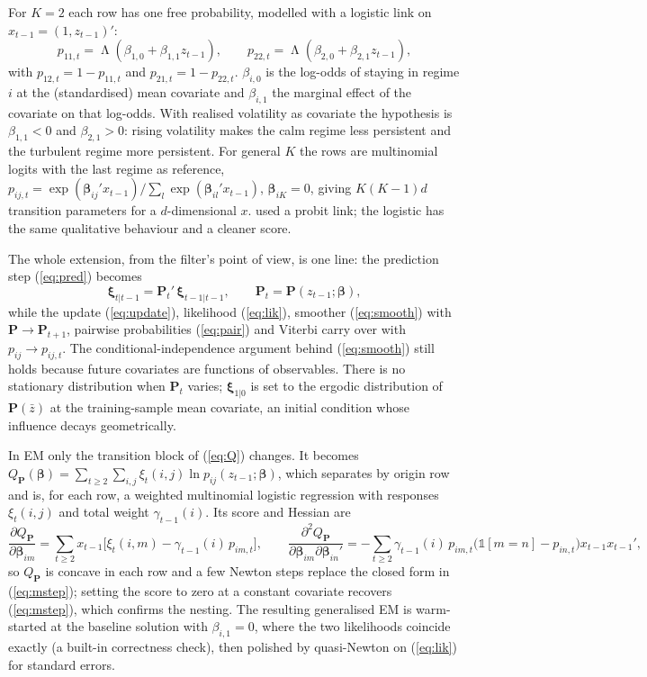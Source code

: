 \documentclass[11pt,a4paper]{article}
\newcommand{\bxi}{\bm{\xi}}
\newcommand{\bP}{\mathbf{P}}
\newcommand{\bbeta}{\bm{\beta}}
\DeclareMathOperator{\Lam}{\Lambda}
\begin{document}
For $K=2$ each row has one free probability, modelled with a logistic link on $x_{t-1}=(1,z_{t-1})'$:
\begin{equation}\label{eq:tvtp2}
p_{11,t}=\Lam(\beta_{1,0}+\beta_{1,1}z_{t-1}),\qquad p_{22,t}=\Lam(\beta_{2,0}+\beta_{2,1}z_{t-1}),
\end{equation}
with $p_{12,t}=1-p_{11,t}$ and $p_{21,t}=1-p_{22,t}$. $\beta_{i,0}$ is the log-odds of staying in regime $i$ at the (standardised) mean covariate and $\beta_{i,1}$ the marginal effect of the covariate on that log-odds. With realised volatility as covariate the hypothesis is $\beta_{1,1}<0$ and $\beta_{2,1}>0$: rising volatility makes the calm regime less persistent and the turbulent regime more persistent. For general $K$ the rows are multinomial logits with the last regime as reference, $p_{ij,t}=\exp(\bbeta_{ij}'x_{t-1})/\sum_l\exp(\bbeta_{il}'x_{t-1})$, $\bbeta_{iK}=0$, giving $K(K-1)d$ transition parameters for a $d$-dimensional $x$. \citet{filardo1994} used a probit link; the logistic has the same qualitative behaviour and a cleaner score.

The whole extension, from the filter's point of view, is one line: the prediction step (\ref{eq:pred}) becomes
\begin{equation}\label{eq:tvtpfilter}
\bxi_{t|t-1}=\bP_t'\,\bxi_{t-1|t-1},\qquad \bP_t=\bP(z_{t-1};\bbeta),
\end{equation}
while the update (\ref{eq:update}), likelihood (\ref{eq:lik}), smoother (\ref{eq:smooth}) with $\bP\to\bP_{t+1}$, pairwise probabilities (\ref{eq:pair}) and Viterbi carry over with $p_{ij}\to p_{ij,t}$. The conditional-independence argument behind (\ref{eq:smooth}) still holds because future covariates are functions of observables. There is no stationary distribution when $\bP_t$ varies; $\bxi_{1|0}$ is set to the ergodic distribution of $\bP(\bar z)$ at the training-sample mean covariate, an initial condition whose influence decays geometrically.

In EM only the transition block of (\ref{eq:Q}) changes. It becomes $Q_{\bP}(\bbeta)=\sum_{t\ge2}\sum_{i,j}\xi_t(i,j)\ln p_{ij}(z_{t-1};\bbeta)$, which separates by origin row and is, for each row, a weighted multinomial logistic regression with responses $\xi_t(i,j)$ and total weight $\gamma_{t-1}(i)$. Its score and Hessian are
\begin{equation}\label{eq:score}
\frac{\partial Q_{\bP}}{\partial\bbeta_{im}}=\sum_{t\ge2}x_{t-1}\bigl[\xi_t(i,m)-\gamma_{t-1}(i)\,p_{im,t}\bigr],\qquad
\frac{\partial^2 Q_{\bP}}{\partial\bbeta_{im}\partial\bbeta_{in}'}=-\sum_{t\ge2}\gamma_{t-1}(i)\,p_{im,t}\bigl(\mathbb 1[m=n]-p_{in,t}\bigr)x_{t-1}x_{t-1}',
\end{equation}
so $Q_{\bP}$ is concave in each row and a few Newton steps replace the closed form in (\ref{eq:mstep}); setting the score to zero at a constant covariate recovers (\ref{eq:mstep}), which confirms the nesting. The resulting generalised EM is warm-started at the baseline solution with $\beta_{i,1}=0$, where the two likelihoods coincide exactly (a built-in correctness check), then polished by quasi-Newton on (\ref{eq:lik}) for standard errors.
\end{document}
